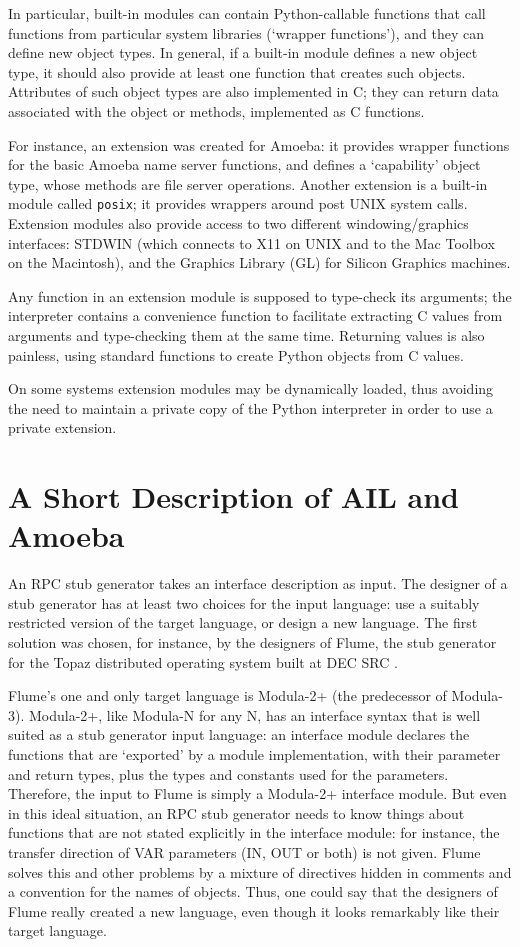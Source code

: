 In particular, built-in modules can contain Python-callable functions
that call functions from particular system libraries (`wrapper
functions'), and they can define new object types.  In general, if a
built-in module defines a new object type, it should also provide at
least one function that creates such objects.  Attributes of such
object types are also implemented in C; they can return data
associated with the object or methods, implemented as C functions.

For instance, an extension was created for Amoeba: it provides wrapper
functions for the basic Amoeba name server functions, and defines a
`capability' object type, whose methods are file server operations.
Another extension is a built-in module called {\tt posix}; it provides
wrappers around post UNIX system calls.  Extension modules also
provide access to two different windowing/graphics interfaces: STDWIN
\cite{STDWIN}
(which connects to X11 on UNIX and to the Mac Toolbox on the
Macintosh), and the Graphics Library (GL) for Silicon Graphics
machines.

Any function in an extension module is supposed to type-check its
arguments; the interpreter contains a convenience function to
facilitate extracting C values from arguments and type-checking them
at the same time.  Returning values is also painless, using standard
functions to create Python objects from C values.

On some systems extension modules may be dynamically loaded, thus
avoiding the need to maintain a private copy of the Python interpreter
in order to use a private extension.

\section{A Short Description of AIL and Amoeba}

An RPC stub generator takes an interface description as input.  The
designer of a stub generator has at least two choices for the input
language: use a suitably restricted version of the target language, or
design a new language.  The first solution was chosen, for instance,
by the designers of Flume, the stub generator for the Topaz
distributed operating system built at DEC SRC
\cite{Flume,Evolving}.

Flume's one and only target language is Modula-2+ (the predecessor of
Modula-3).  Modula-2+, like Modula-N for any N, has an interface
syntax that is well suited as a stub generator input language: an
interface module declares the functions that are `exported' by a
module implementation, with their parameter and return types, plus the
types and constants used for the parameters.  Therefore, the input to
Flume is simply a Modula-2+ interface module.  But even in this ideal
situation, an RPC stub generator needs to know things about functions
that are not stated explicitly in the interface module: for instance,
the transfer direction of VAR parameters (IN, OUT or both) is not
given.  Flume solves this and other problems by a mixture of
directives hidden in comments and a convention for the names of
objects.  Thus, one could say that the designers of Flume really
created a new language, even though it looks remarkably like their
target language.

